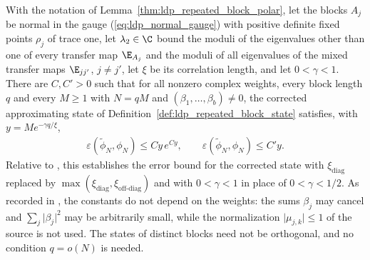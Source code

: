 \begin{lemma}
    \label{thm:ldp_approximation_error_repeated_overlapping}
    \leanok
    With the notation of Lemma~\ref{thm:ldp_repeated_block_polar}, let the blocks $A_j$
    be normal in the gauge (\ref{eq:ldp_normal_gauge}) with positive definite fixed points
    $\rho_j$ of trace one, let $\lambda_2\in\C$ bound the moduli of the eigenvalues other
    than one of every transfer map $\E_{A_j}$ and the moduli of all eigenvalues of the
    mixed transfer maps $\E_{jj'}$, $j\neq j'$, let $\xi$ be its correlation length, and
    let $0<\gamma<1$. There are $C,C'>0$ such that for all nonzero complex weights, every
    block length $q$ and every $M\geq1$ with $N=qM$ and $(\beta_1,\dots,\beta_b)\neq0$, the
    corrected approximating state of Definition~\ref{def:ldp_repeated_block_state}
    satisfies, with $y=Me^{-\gamma q/\xi}$,
    \begin{align*}
        \varepsilon(\widetilde\phi_N,\phi_N)\leq Cy\,e^{Cy},\qquad
        \varepsilon(\widetilde\phi_N,\phi_N)\leq C'y.
    \end{align*}
    Relative to \cite[Lemma~1$'$(ii)]{Malz2024Preparation}, this establishes the
    error bound for the corrected state with $\xi_{\mathrm{diag}}$ replaced by
    $\max(\xi_{\mathrm{diag}},\xi_{\mathrm{off\text{-}diag}})$ and with $0<\gamma<1$ in
    place of $0<\gamma<1/2$. As recorded in
    \cite{gap:mswc24_repeated_overlap_small_weight_sum}, the constants do not depend on
    the weights: the sums $\beta_j$ may cancel and $\sum_j\lvert\beta_j\rvert^2$ may be
    arbitrarily small, while the normalization $\lvert\mu_{j,k}\rvert\leq1$ of the source
    is not used. The states of distinct blocks need not be orthogonal, and no condition
    $q=o(N)$ is needed.
\end{lemma}
